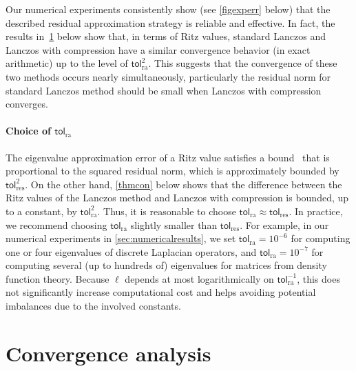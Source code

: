 \documentclass{siamart190516}
\newcommand{\tol}{\mathsf{tol}}
\begin{document}
Our numerical experiments consistently show (see \cref{figexperr} below) that the described residual approximation strategy is reliable and effective. 
In fact, the results in~\cref{sec:convergence} below show that, in terms of Ritz values, standard Lanczos and Lanczos with compression have a similar convergence behavior (in exact arithmetic) up to the level of $\tol_{\mathrm{ra}}^{2}$. This suggests that the convergence of these two methods occurs nearly simultaneously, particularly the residual norm for standard Lanczos method should be small when Lanczos with compression converges.

\paragraph{Choice of $\tol_{\mathrm{ra}}$}

The eigenvalue approximation error of a Ritz value satisfies a bound~\cite[Chap.~4, Thm.~2.17]{Stewart2001}  that is proportional to the squared residual norm, which is approximately bounded by $\tol_{\mathrm{res}}^{2}$.
On the other hand, \cref{thmcon} below shows that
the difference between the Ritz values of the Lanczos method and Lanczos with compression is bounded, up to a constant, by $\tol_{\mathrm{ra}}^{2}$. 
Thus, it is reasonable to choose $\tol_{\mathrm{ra}} \approx \tol_{\mathrm{res}}$. 
In practice, we recommend choosing $\tol_{\mathrm{ra}}$ slightly smaller than $\tol_{\mathrm{res}}$. For example, in our numerical experiments in \cref{sec:numericalresults}, we set  $\tol_{\mathrm{ra}} = 10^{-6}$ for computing one or four eigenvalues of discrete Laplacian operators, and $\tol_{\mathrm{ra}}=10^{-7}$ for computing several (up to hundreds of) eigenvalues for matrices from density function theory. Because $\ell$ depends at most logarithmically on $\tol_{\mathrm{ra}}^{-1}$, this does not significantly increase computational cost and helps avoiding potential imbalances due to the involved constants.




\section{Convergence analysis} \label{sec:convergence} 
\end{document}
